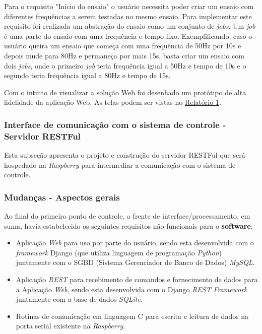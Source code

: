     Para o requisito "Início do ensaio" o usuário necessita poder criar um ensaio com diferentes frequências a serem testadas no mesmo ensaio.
    Para implementar este requisito foi realizada um abstração do ensaio como um conjunto de \textit{jobs}.
    Um \textit{job} é uma parte do ensaio com uma frequência e tempo fixo. Exemplificando, caso o usuário queira um ensaio que começa com uma
    frequência de 50Hz por 10s e depois mude para 80Hz e permaneça por mais 15s, basta criar um ensaio com dois \textit{jobs}, onde o primeiro
    \textit{job} teria frequência igual a 50Hz e tempo de 10s e o segundo teria frequência igual a 80Hz e tempo de 15s.
    
    Com o intuito de visualizar a solução Web foi desenhado um protótipo de alta fidelidade da aplicação Web. 
    As telas podem ser vistas no \href{https://drive.google.com/file/d/0B5InkGKx6O-MR1B3eVYzZFpjQ3c/view?usp=sharing}{Relatório 1}.

\subsubsection{\textbf{Interface de comunicação com o sistema de controle - Servidor RESTFul}}
   
   Esta subseção apresenta o projeto e construção do servidor RESTFul que será hospedado na \textit{Raspberry} para intermediar a comunicação
   com o sistema de controle.
  
\subsubsection*{\textbf{Mudanças - Aspectos gerais}}
    
Ao final do primeiro ponto de controle, a frente de interface/processamento, em suma, havia estabelecido os seguintes requisitos não-funcionais para o \textbf{software}:

\begin{itemize}
    \item Aplicação \textit{Web} para uso por parte do usuário, sendo esta desenvolvida com o \textit{framework} Django (que utiliza linguagem de programação \textit{Python}) juntamente com o SGBD (Sistema Gerenciador de Banco de Dados) \textit{MySQL}.
    \item Aplicação \textit{REST} para recebimento de comandos e fornecimento de dados para a Aplicação \textit{Web}, sendo esta desenvolvida com o Django \textit{REST} \textit{Framework} juntamente com a base de dados \textit{SQLite}.
    \item Rotinas de comunicação em linguagem C para escrita e leitura de dados na porta serial existente na \textit{Raspberry}.
\end{itemize}


